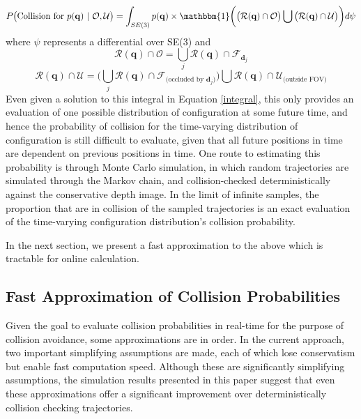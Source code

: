 \documentclass{llncs}
\begin{document}
%
\begin{equation}
\label{integral}
P \big( \text{Collision for } p(\mathbf{q} ) \ | \ \mathcal{O}, \mathcal{U}  \big)= \int_{SE(3)} p(\mathbf{q}) \times \mathbbm{1} \bigg(  \big(\mathcal{R}(\mathbf{q}) \cap \mathcal{O} \big) \bigcup  \big(\mathcal{R}(\mathbf{q}) \cap \mathcal{U} \big) \bigg) d\psi
\end{equation}
%
where $\psi$ represents a differential over SE(3) and
%
\begin{equation}
\mathcal{R}(\mathbf{q}) \cap \mathcal{O} = \bigcup_j \mathcal{R}(\mathbf{q}) \cap \mathcal{F}_{{\mathbf{d}_j}}
\end{equation}
%
\begin{equation}
\mathcal{R}(\mathbf{q}) \cap \mathcal{U} = \big( \bigcup_j \mathcal{R}(\mathbf{q}) \cap \mathcal{F}_{\text{(occluded by } {\mathbf{d}_j})} \big) \bigcup \mathcal{R}(\mathbf{q}) \cap \mathcal{U}_{\text{(outside FOV)}}
\end{equation}
%
Even given a solution to this integral in Equation \ref{integral}, this only provides an evaluation of one possible distribution of configuration at some future time, and hence the probability of collision for the time-varying distribution of configuration is still difficult to evaluate, given that all future positions in time are dependent on previous positions in time.  One route to estimating this probability is through Monte Carlo simulation, in which random trajectories are simulated through the Markov chain, and collision-checked deterministically against the conservative depth image.  In the limit of infinite samples, the proportion that are in collision of the sampled trajectories is an exact evaluation of the time-varying configuration distribution's collision probability.

In the next section, we present a fast approximation to the above which is tractable for online calculation.

\subsection{Fast Approximation of Collision Probabilities}

Given the goal to evaluate collision probabilities in real-time for the purpose of collision avoidance, some approximations are in order.  In the current approach, two important simplifying assumptions are made, each of which lose conservatism but enable fast computation speed.  Although these are significantly simplifying assumptions, the simulation results presented in this paper suggest that even these approximations offer a significant improvement over deterministically collision checking trajectories.
\end{document}
